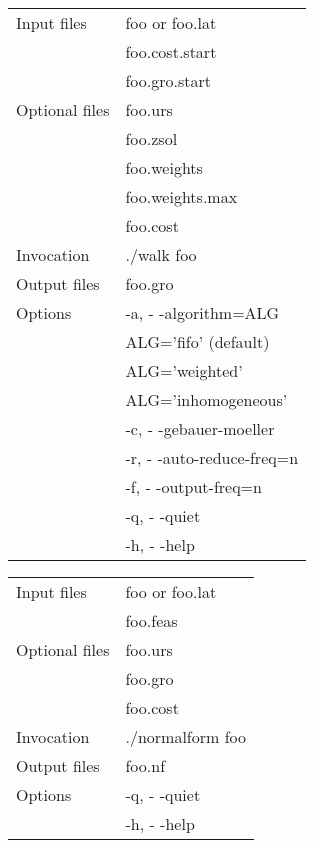 \documentclass[12pt]{article}
\theoremstyle{definition}
\begin{document}
\begin{center}
\begin{tabular}{|l|l|}
\hline
Input files    & foo or foo.lat \\
               & foo.cost.start \\
               & foo.gro.start  \\
\hline
Optional files & foo.urs         \\
	       & foo.zsol        \\
	       & foo.weights     \\
               & foo.weights.max \\
               & foo.cost        \\
\hline
Invocation     & ./walk foo \\
Output files   & foo.gro        \\
\hline
Options        & -a, - -algorithm=ALG \\
               & ALG='fifo' (default) \\
	       & ALG='weighted' \\
	       & ALG='inhomogeneous' \\
	       & -c, - -gebauer-moeller \\
	       & -r, - -auto-reduce-freq=n \\
	       & -f, - -output-freq=n \\
	       & -q, - -quiet \\
	       & -h, - -help \\
\hline
\end{tabular}
\end{center}



\begin{center}
\begin{tabular}{|l|l|}
\hline
Input files    & foo or foo.lat \\
               & foo.feas \\
\hline
Optional files & foo.urs         \\
	       & foo.gro         \\
               & foo.cost        \\
\hline
Invocation     & ./normalform foo \\
Output files   & foo.nf           \\
\hline
Options        & -q, - -quiet \\
	       & -h, - -help \\
\hline
\end{tabular}
\end{center}
\end{document}
